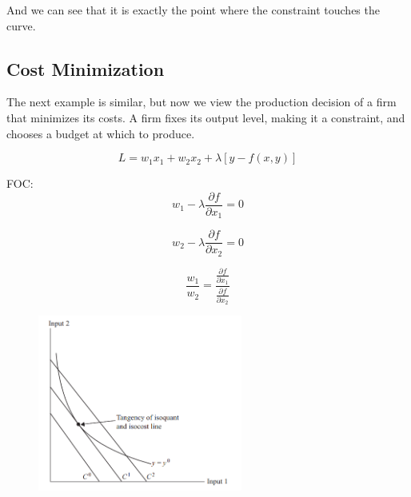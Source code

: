 \documentclass[]{article}
\begin{document}
And we can see that it is exactly the point where the constraint touches the curve.

\subsection{Cost Minimization}

The next example is similar, but now we view the production decision of a firm that minimizes its costs. A firm fixes its output level, making it a constraint, and chooses a budget at which to produce. 

$$L=w_1x_1+w_2x_2+\lambda[y-f(x,y)]$$

FOC:
\begin{equation}
w_1-\lambda \frac{\partial f}{\partial x_1}=0 
\end{equation}

\begin{equation}
w_2-\lambda \frac{\partial f}{\partial x_2}=0 
\end{equation}

\begin{equation}
\frac{w_1}{w_2}= \frac{\frac{\partial f}{\partial x_1}}{\frac{\partial f}{\partial x_2}}
\end{equation}

\begin{figure}[h]
    \centering
    \includegraphics[width=0.60\textwidth]{cost_minimization.png}
\end{figure}
\end{document}
